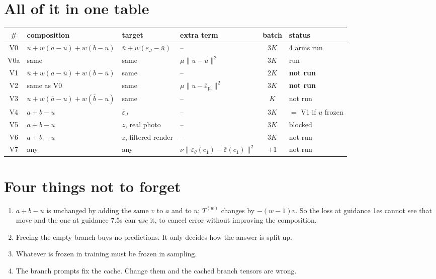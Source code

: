 \documentclass[11pt]{article}
\newcommand{\eps}{\varepsilon}
\newcommand{\B}[1]{\textbf{#1}}
\begin{document}
\section{All of it in one table}

\begin{center}
\small
\begin{tabular}{c l l l c l}
\toprule
\# & composition & target & extra term & batch & status \\
\midrule
V0  & $u + w(a{-}u) + w(b{-}u)$              & $\bar u + w(\bar\eps_J{-}\bar u)$ & --                        & $3K$ & 4 arms run \\
V0a & same                                    & same                              & $\mu\lVert u-\bar u\rVert^2$ & $3K$ & run \\
V1  & $\bar u + w(a{-}\bar u) + w(b{-}\bar u)$& same                              & --                        & $2K$ & \B{not run} \\
V2  & same as V0                              & same                              & $\mu\lVert u-\bar\eps_{\text{pl}}\rVert^2$ & $3K$ & \B{not run} \\
V3  & $u + w(\bar a{-}u) + w(\bar b{-}u)$     & same                              & --                        & $K$  & not run \\
V4  & $a + b - u$                             & $\bar\eps_J$                      & --                        & $3K$ & $=$ V1 if $u$ frozen \\
V5  & $a + b - u$                             & $z$, real photo                   & --                        & $3K$ & blocked \\
V6  & $a + b - u$                             & $z$, filtered render              & --                        & $3K$ & not run \\
V7  & any                                     & any                               & $\nu\lVert \eps_\theta(c_1)-\bar\eps(c_1)\rVert^2$ & $+1$ & not run \\
\bottomrule
\end{tabular}
\end{center}

\section{Four things not to forget}

\begin{enumerate}
\item $a+b-u$ is unchanged by adding the same $v$ to $a$ and to $u$; $T^{(w)}$ changes by
  $-(w-1)v$. So the loss at guidance 1es cannot see that move and the one at guidance 7.5s can \emph{use} it,
  to cancel error without improving the composition.
\item Freeing the empty branch buys no predictions. It only decides how the answer is split up.
\item Whatever is frozen in training must be frozen in sampling.
\item The branch prompts fix the cache. Change them and the cached branch tensors are wrong.
\end{enumerate}
\end{document}
